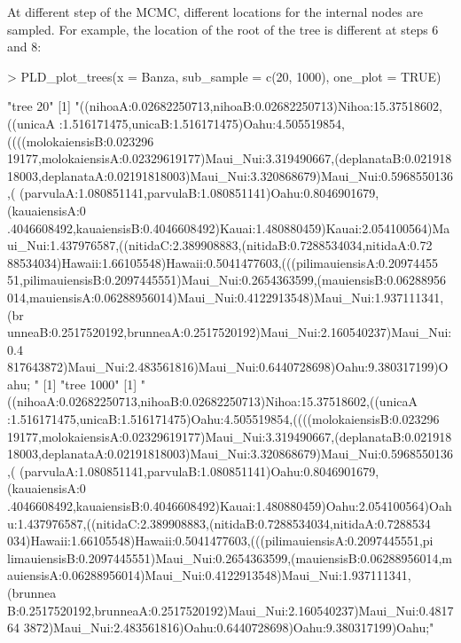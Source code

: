 \documentclass[a4paper]{article}
\begin{document}
At different step of the MCMC, different locations for the internal nodes are sampled.
For example, the location of the root of the tree is different at steps 6 and 8:
\begin{Schunk}
\begin{Sinput}
> PLD_plot_trees(x = Banza, sub_sample = c(20, 1000), one_plot = TRUE)
\end{Sinput}
\begin{Soutput}
[1] "tree 20"
[1] "((nihoaA:0.02682250713,nihoaB:0.02682250713)Nihoa:15.37518602,((unicaA
:1.516171475,unicaB:1.516171475)Oahu:4.505519854,((((molokaiensisB:0.023296
19177,molokaiensisA:0.02329619177)Maui_Nui:3.319490667,(deplanataB:0.021918
18003,deplanataA:0.02191818003)Maui_Nui:3.320868679)Maui_Nui:0.5968550136,(
(parvulaA:1.080851141,parvulaB:1.080851141)Oahu:0.8046901679,(kauaiensisA:0
.4046608492,kauaiensisB:0.4046608492)Kauai:1.480880459)Kauai:2.054100564)Ma
ui_Nui:1.437976587,((nitidaC:2.389908883,(nitidaB:0.7288534034,nitidaA:0.72
88534034)Hawaii:1.66105548)Hawaii:0.5041477603,(((pilimauiensisA:0.20974455
51,pilimauiensisB:0.2097445551)Maui_Nui:0.2654363599,(mauiensisB:0.06288956
014,mauiensisA:0.06288956014)Maui_Nui:0.4122913548)Maui_Nui:1.937111341,(br
unneaB:0.2517520192,brunneaA:0.2517520192)Maui_Nui:2.160540237)Maui_Nui:0.4
817643872)Maui_Nui:2.483561816)Maui_Nui:0.6440728698)Oahu:9.380317199)Oahu;
"
[1] "tree 1000"
[1] "((nihoaA:0.02682250713,nihoaB:0.02682250713)Nihoa:15.37518602,((unicaA
:1.516171475,unicaB:1.516171475)Oahu:4.505519854,((((molokaiensisB:0.023296
19177,molokaiensisA:0.02329619177)Maui_Nui:3.319490667,(deplanataB:0.021918
18003,deplanataA:0.02191818003)Maui_Nui:3.320868679)Maui_Nui:0.5968550136,(
(parvulaA:1.080851141,parvulaB:1.080851141)Oahu:0.8046901679,(kauaiensisA:0
.4046608492,kauaiensisB:0.4046608492)Kauai:1.480880459)Oahu:2.054100564)Oah
u:1.437976587,((nitidaC:2.389908883,(nitidaB:0.7288534034,nitidaA:0.7288534
034)Hawaii:1.66105548)Hawaii:0.5041477603,(((pilimauiensisA:0.2097445551,pi
limauiensisB:0.2097445551)Maui_Nui:0.2654363599,(mauiensisB:0.06288956014,m
auiensisA:0.06288956014)Maui_Nui:0.4122913548)Maui_Nui:1.937111341,(brunnea
B:0.2517520192,brunneaA:0.2517520192)Maui_Nui:2.160540237)Maui_Nui:0.481764
3872)Maui_Nui:2.483561816)Oahu:0.6440728698)Oahu:9.380317199)Oahu;"
\end{Soutput}
\end{Schunk}
\end{document}
